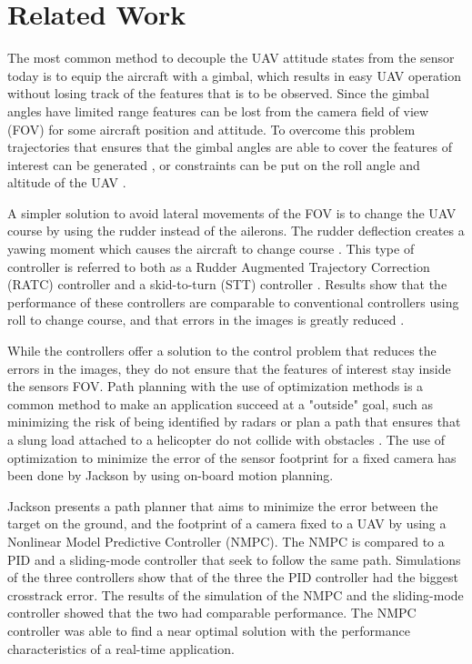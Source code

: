 \section{Related Work}

The most common method to decouple the UAV attitude states from the sensor today is to equip the aircraft with a gimbal, which results in easy UAV operation without losing track of the features that is to be observed. Since the gimbal angles have limited range features can be lost from the camera field of view (FOV) for some aircraft position and attitude. To overcome this problem trajectories that ensures that the gimbal angles are able to cover the features of interest can be generated \cite{nundalSKJONG}, or constraints can be put on the roll angle and altitude of the UAV \cite{constraintsEGBERT}.

A simpler solution to avoid lateral movements of the FOV is to change the UAV course by using the rudder instead of the ailerons. The rudder deflection creates a yawing moment which causes the aircraft to change course \cite{ratcFISHER}. This type of controller is referred to both as a Rudder Augmented Trajectory Correction (RATC) controller \cite{ratcFISHER} and a skid-to-turn (STT) controller \cite{skidMILLS}. Results show that the performance of these controllers are comparable to conventional controllers using roll to change course, and that errors in the images is greatly reduced \cite{ratcFISHER}\cite{skidMILLS}\cite{alternateAHSAN}.

While the controllers offer a solution to the control problem that reduces the errors in the images, they do not ensure that the features of interest stay inside the sensors FOV. Path planning with the use of optimization methods is a common method to make an application succeed at a "outside" goal, such as minimizing the risk of being identified by radars \cite{radarINANC} or plan a path that ensures that a slung load attached to a helicopter do not collide with obstacles \cite{slungANDERSLACOUR}. The use of optimization to minimize the error of the sensor footprint for a fixed camera has been done by Jackson \cite{optimJACKSON} by using on-board motion planning.

Jackson presents a path planner that aims to minimize the error between the target on the ground, and the footprint of a camera fixed to a UAV by using a Nonlinear Model Predictive Controller (NMPC). The NMPC is compared to a PID and a sliding-mode controller that seek to follow the same path. Simulations of the three controllers show that of the three the PID controller had the biggest crosstrack error. The results of the simulation of the NMPC and the sliding-mode controller showed that the two had comparable performance. The NMPC controller was able to find a near optimal solution with the performance characteristics of a real-time application.

